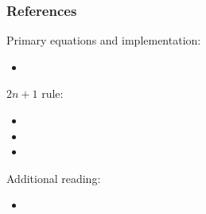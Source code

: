 \subsubsection{References}

Primary equations and implementation:

\begin{itemize}
  \tightlist
\item {}
\end{itemize}

\(2n + 1\) rule:

\begin{itemize}
  \tightlist
\item {}
\item {}
\item {}
\end{itemize}

Additional reading:

\begin{itemize}
  \tightlist
  \item {}
\end{itemize}
